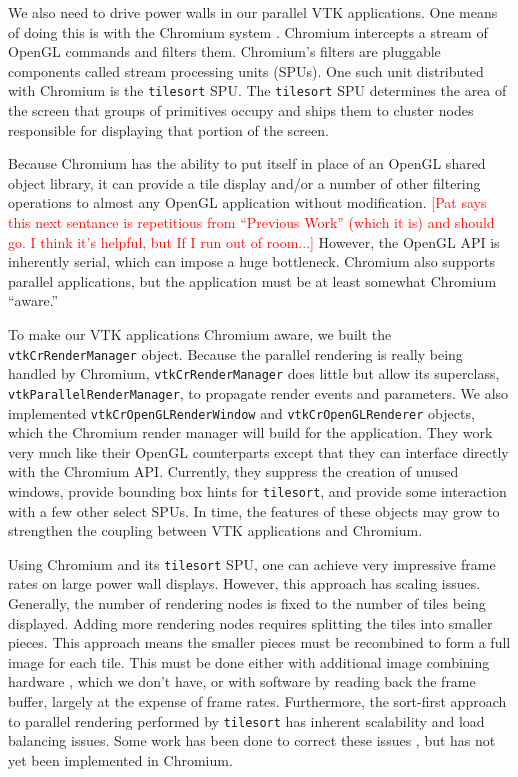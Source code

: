 \documentclass[twocolumn]{article}
\newcommand{\sticky}[1]{\textcolor{Red}{[#1]}}
\newcommand{\cidentifier}[1]{\texttt{#1}}
\begin{document}
  We also need to drive power walls in our parallel VTK applications.  One
  means of doing this is with the Chromium system \cite{Humphreys02}.
  Chromium intercepts a stream of OpenGL commands and filters them.
  Chromium's filters are pluggable components called stream processing
  units (SPUs).  One such unit distributed with Chromium is the
  \cidentifier{tile\-sort} SPU.  The \cidentifier{tile\-sort} SPU
  determines the area of the screen that groups of primitives occupy and
  ships them to cluster nodes responsible for displaying that portion of
  the screen.

  Because Chromium has the ability to put itself in place of an OpenGL
  shared object library, it can provide a tile display and/or a number of
  other filtering operations to almost any OpenGL application without
  modification.  \sticky{Pat says this next sentance is repetitious from
  ``Previous Work'' (which it is) and should go.  I think it's helpful, but
  If I run out of room...}  However, the OpenGL API is inherently serial,
  which can impose a huge bottleneck.  Chromium also supports parallel
  applications, but the application must be at least somewhat Chromium
  ``aware.''

  To make our VTK applications Chromium aware, we built the
  \cidentifier{vtk\-Cr\-Render\-Manager} object.  Because the parallel
  rendering is really being handled by Chromium,
  \cidentifier{vtk\-Cr\-Render\-Manager} does little but allow its
  superclass, \cidentifier{vtk\-Parallel\-Render\-Manager}, to propagate
  render events and parameters.  We also implemented
  \cidentifier{vtk\-Cr\-Open\-GL\-Render\-Window} and
  \cidentifier{vtk\-Cr\-Open\-GL\-Renderer} objects, which the Chromium
  render manager will build for the application.  They work very much like
  their OpenGL counterparts except that they can interface directly with
  the Chromium API.  Currently, they suppress the creation of unused
  windows, provide bounding box hints for \cidentifier{tile\-sort}, and
  provide some interaction with a few other select SPUs.  In time, the
  features of these objects may grow to strengthen the coupling between VTK
  applications and Chromium.

  Using Chromium and its \cidentifier{tile\-sort} SPU, one can achieve very
  impressive frame rates on large power wall displays.  However, this
  approach has scaling issues.  Generally, the number of rendering nodes is
  fixed to the number of tiles being displayed.  Adding more rendering
  nodes requires splitting the tiles into smaller pieces.  This approach
  means the smaller pieces must be recombined to form a full image for each
  tile.  This must be done either with additional image combining hardware
  \cite{Stoll01}, which we don't have, or with software by reading back the
  frame buffer, largely at the expense of frame rates.  Furthermore, the
  sort-first approach to parallel rendering performed by
  \cidentifier{tile\-sort} has inherent scalability and load balancing
  issues.  Some work has been done to correct these issues
  \cite{Samanta99}, but has not yet been implemented in Chromium.
\end{document}
